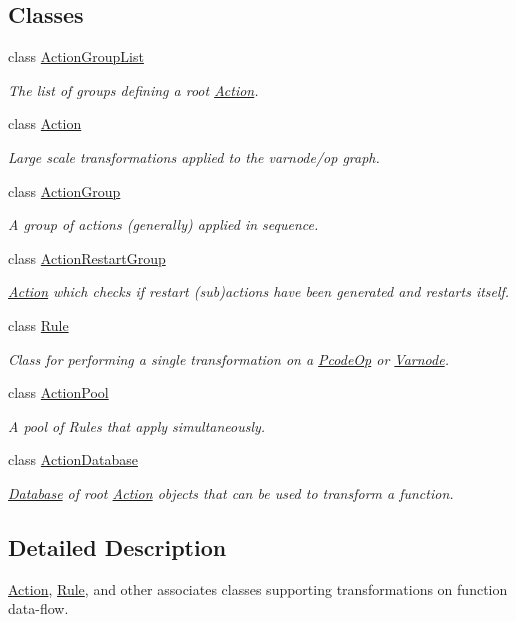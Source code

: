 \subsection*{Classes}
\begin{DoxyCompactItemize}
\item 
class \mbox{\hyperlink{class_action_group_list}{Action\+Group\+List}}
\begin{DoxyCompactList}\small\item\em The list of groups defining a {\itshape root} \mbox{\hyperlink{class_action}{Action}}. \end{DoxyCompactList}\item 
class \mbox{\hyperlink{class_action}{Action}}
\begin{DoxyCompactList}\small\item\em Large scale transformations applied to the varnode/op graph. \end{DoxyCompactList}\item 
class \mbox{\hyperlink{class_action_group}{Action\+Group}}
\begin{DoxyCompactList}\small\item\em A group of actions (generally) applied in sequence. \end{DoxyCompactList}\item 
class \mbox{\hyperlink{class_action_restart_group}{Action\+Restart\+Group}}
\begin{DoxyCompactList}\small\item\em \mbox{\hyperlink{class_action}{Action}} which checks if restart (sub)actions have been generated and restarts itself. \end{DoxyCompactList}\item 
class \mbox{\hyperlink{class_rule}{Rule}}
\begin{DoxyCompactList}\small\item\em Class for performing a single transformation on a \mbox{\hyperlink{class_pcode_op}{Pcode\+Op}} or \mbox{\hyperlink{class_varnode}{Varnode}}. \end{DoxyCompactList}\item 
class \mbox{\hyperlink{class_action_pool}{Action\+Pool}}
\begin{DoxyCompactList}\small\item\em A pool of Rules that apply simultaneously. \end{DoxyCompactList}\item 
class \mbox{\hyperlink{class_action_database}{Action\+Database}}
\begin{DoxyCompactList}\small\item\em \mbox{\hyperlink{class_database}{Database}} of root \mbox{\hyperlink{class_action}{Action}} objects that can be used to transform a function. \end{DoxyCompactList}\end{DoxyCompactItemize}


\subsection{Detailed Description}
\mbox{\hyperlink{class_action}{Action}}, \mbox{\hyperlink{class_rule}{Rule}}, and other associates classes supporting transformations on function data-\/flow. 

